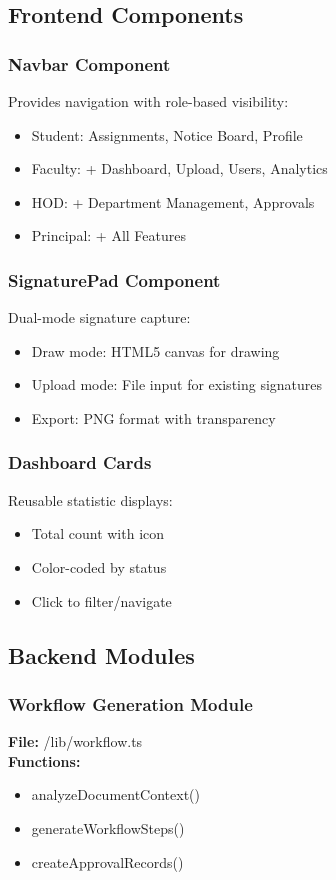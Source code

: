 \subsection{Frontend Components}

\subsubsection{Navbar Component}
Provides navigation with role-based visibility:
\begin{itemize}
\item Student: Assignments, Notice Board, Profile
\item Faculty: + Dashboard, Upload, Users, Analytics
\item HOD: + Department Management, Approvals
\item Principal: + All Features
\end{itemize}

\subsubsection{SignaturePad Component}
Dual-mode signature capture:
\begin{itemize}
\item Draw mode: HTML5 canvas for drawing
\item Upload mode: File input for existing signatures
\item Export: PNG format with transparency
\end{itemize}

\subsubsection{Dashboard Cards}
Reusable statistic displays:
\begin{itemize}
\item Total count with icon
\item Color-coded by status
\item Click to filter/navigate
\end{itemize}

\subsection{Backend Modules}

\subsubsection{Workflow Generation Module}
\textbf{File:} /lib/workflow.ts\\
\textbf{Functions:}
\begin{itemize}
\item analyzeDocumentContext()
\item generateWorkflowSteps()
\item createApprovalRecords()
\end{itemize}

